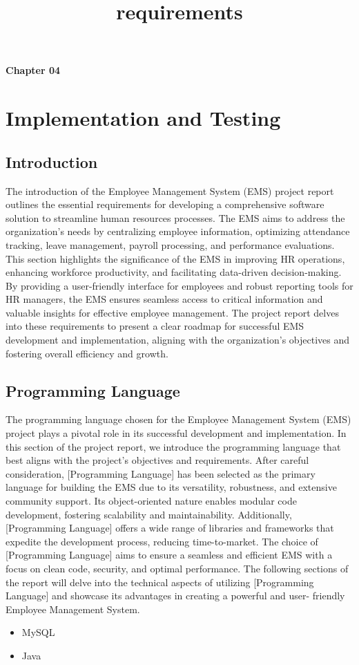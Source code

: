 \title{requirements}
\begin{center}
    \textbf{Chapter 04}\\
  \section{  \large \textbf{Implementation and Testing }}
\end{center}
\vspace{2.5mm}
\subsection{Introduction}
The introduction of the Employee Management System (EMS) project report outlines the
essential requirements for developing a comprehensive software solution to streamline
human resources processes. The EMS aims to address the organization's needs by
centralizing employee information, optimizing attendance tracking, leave management,
payroll processing, and performance evaluations. This section highlights the significance of
the EMS in improving HR operations, enhancing workforce productivity, and facilitating
data-driven decision-making. By providing a user-friendly interface for employees and
robust reporting tools for HR managers, the EMS ensures seamless access to critical
information and valuable insights for effective employee management. The project report
delves into these requirements to present a clear roadmap for successful EMS development
and implementation, aligning with the organization's objectives and fostering overall
efficiency and growth.
\subsection{Programming Language}
The programming language chosen for the Employee Management System (EMS) project
plays a pivotal role in its successful development and implementation. In this section of the
project report, we introduce the programming language that best aligns with the project's
objectives and requirements. After careful consideration, [Programming Language] has
been selected as the primary language for building the EMS due to its versatility,
robustness, and extensive community support. Its object-oriented nature enables modular
code development, fostering scalability and maintainability. Additionally, [Programming
Language] offers a wide range of libraries and frameworks that expedite the development
process, reducing time-to-market. The choice of [Programming Language] aims to ensure a
seamless and efficient EMS with a focus on clean code, security, and optimal performance.
The following sections of the report will delve into the technical aspects of utilizing
[Programming Language] and showcase its advantages in creating a powerful and user-
friendly Employee Management System.
\begin{itemize}
    \item MySQL
    \item Java
\end{itemize}
